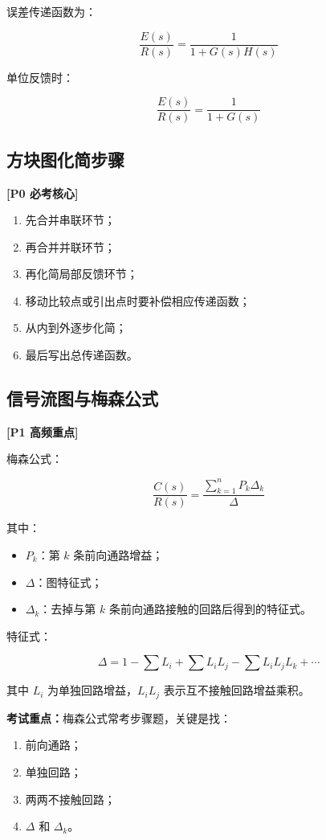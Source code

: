 \documentclass[UTF8,a4paper,12pt]{ctexart}
\newcommand{\Pzero}{\textcolor{p0}{\textbf{[P0 必考核心]}}}
\newcommand{\Pone}{\textcolor{p1}{\textbf{[P1 高频重点]}}}
\newcommand{\exam}{\textcolor{p0}{\textbf{考试重点：}}}
\begin{document}
误差传递函数为：

\[
\frac{E(s)}{R(s)}=\frac{1}{1+G(s)H(s)}
\]

单位反馈时：

\[
\frac{E(s)}{R(s)}=\frac{1}{1+G(s)}
\]

\subsection{方块图化简步骤}

\Pzero

\begin{enumerate}
    \item 先合并串联环节；
    \item 再合并并联环节；
    \item 再化简局部反馈环节；
    \item 移动比较点或引出点时要补偿相应传递函数；
    \item 从内到外逐步化简；
    \item 最后写出总传递函数。
\end{enumerate}

\subsection{信号流图与梅森公式}

\Pone

梅森公式：

\[
\frac{C(s)}{R(s)}=\frac{\sum_{k=1}^{n}P_k\Delta_k}{\Delta}
\]

其中：

\begin{itemize}
    \item $P_k$：第 $k$ 条前向通路增益；
    \item $\Delta$：图特征式；
    \item $\Delta_k$：去掉与第 $k$ 条前向通路接触的回路后得到的特征式。
\end{itemize}

特征式：

\[
\Delta=1-\sum L_i+\sum L_iL_j-\sum L_iL_jL_k+\cdots
\]

其中 $L_i$ 为单独回路增益，$L_iL_j$ 表示互不接触回路增益乘积。

\exam 梅森公式常考步骤题，关键是找：
\begin{enumerate}
    \item 前向通路；
    \item 单独回路；
    \item 两两不接触回路；
    \item $\Delta$ 和 $\Delta_k$。
\end{enumerate}
\end{document}
